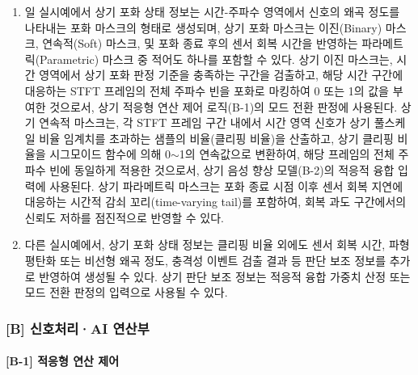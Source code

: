 \documentclass{article}
\DeclareRobustCommand{\vtwoedit}[1]{\textcolor{customgreen}{#1}}
\begin{document}
\begin{enumerate}[label = \textbf{(A.2.\arabic*)}]
    \item \vtwoedit{일 실시예에서 상기 포화 상태 정보는 시간-주파수 영역에서 신호의 왜곡 정도를 나타내는 포화 마스크의 형태로 생성되며, 상기 포화 마스크는 이진(Binary) 마스크, 연속적(Soft) 마스크, 및 포화 종료 후의 센서 회복 시간을 반영하는 파라메트릭(Parametric) 마스크 중 적어도 하나를 포함할 수 있다. 상기 이진 마스크는, 시간 영역에서 상기 포화 판정 기준을 충족하는 구간을 검출하고, 해당 시간 구간에 대응하는 STFT 프레임의 전체 주파수 빈을 포화로 마킹하여 0 또는 1의 값을 부여한 것으로서, 상기 적응형 연산 제어 로직(B-1)의 모드 전환 판정에 사용된다. 상기 연속적 마스크는, 각 STFT 프레임 구간 내에서 시간 영역 신호가 상기 풀스케일 비율 임계치를 초과하는 샘플의 비율(클리핑 비율)을 산출하고, 상기 클리핑 비율을 시그모이드 함수에 의해 0$\sim$1의 연속값으로 변환하여, 해당 프레임의 전체 주파수 빈에 동일하게 적용한 것으로서, 상기 음성 향상 모델(B-2)의 적응적 융합 입력에 사용된다. 상기 파라메트릭 마스크는 포화 종료 시점 이후 센서 회복 지연에 대응하는 시간적 감쇠 꼬리(time-varying tail)를 포함하여, 회복 과도 구간에서의 신뢰도 저하를 점진적으로 반영할 수 있다.}
    
    \item \vtwoedit{다른 실시예에서, 상기 포화 상태 정보는 클리핑 비율 외에도 센서 회복 시간, 파형 평탄화 또는 비선형 왜곡 정도, 충격성 이벤트 검출 결과 등 판단 보조 정보를 추가로 반영하여 생성될 수 있다. 상기 판단 보조 정보는 적응적 융합 가중치 산정 또는 모드 전환 판정의 입력으로 사용될 수 있다.}

\end{enumerate}



\subsubsection{[B] 신호처리·AI 연산부}

\paragraph{[B-1] 적응형 연산 제어}
\end{document}
